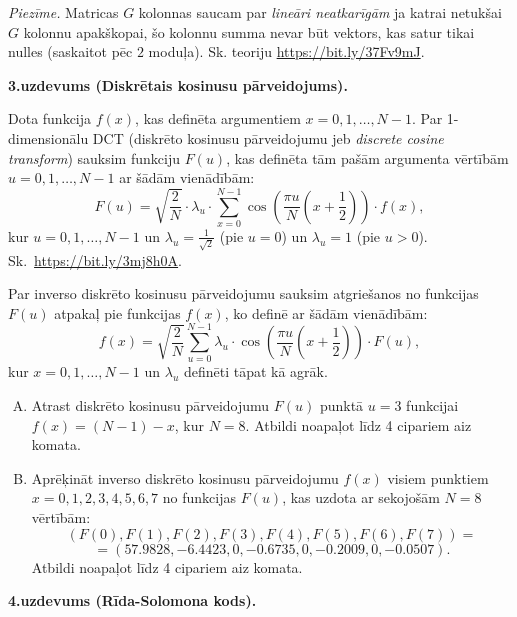 \documentclass[a4paper]{article}
\begin{document}
{\em Piezīme.} Matricas $G$ kolonnas saucam par {\em lineāri neatkarīgām} 
ja katrai netukšai $G$ kolonnu apakš\-ko\-pai, šo kolonnu summa nevar būt vektors, 
kas satur tikai nulles (saskaitot pēc $2$ moduļa).
Sk. teoriju \url{https://bit.ly/37Fv9mJ}.


\vspace{20pt}
{\bf 3.uzdevums (Diskrētais kosinusu pārveidojums).}

Dota funkcija $f(x)$, kas definēta argumentiem $x=0,1,\ldots,N-1$.
Par 1-dimensionālu DCT (diskrēto kosinusu pārveidojumu jeb {\em discrete cosine transform}) sauksim
funkciju $F(u)$, kas definēta tām pašām argumenta vērtībām $u=0,1,\ldots,N-1$
ar šādām vienādībām:
$$F(u) = \sqrt{\frac{2}{N}} \cdot \lambda_u \cdot \sum\limits_{x=0}^{N-1} \cos \left( \frac{\pi u}{N}\left(  x+\frac{1}{2} \right) \right) \cdot f(x),$$
kur $u=0,1,\ldots,N-1$ un $\lambda_u = \frac{1}{\sqrt{2}}$ (pie $u=0$) un $\lambda_u = 1$ (pie $u>0$).\\
Sk.\ \url{https://bit.ly/3mj8h0A}.

Par inverso diskrēto kosinusu pārveidojumu sauksim atgriešanos no funkcijas $F(u)$ atpakaļ pie funk\-ci\-jas $f(x)$,
ko definē ar šādām vienādībām:
$$f(x) = \sqrt{\frac{2}{N}} \sum\limits_{u=0}^{N-1} \lambda_u \cdot \cos \left( \frac{\pi u}{N}\left(  x+\frac{1}{2} \right) \right) \cdot F(u),$$
kur $x=0,1,\ldots,N-1$ un $\lambda_u$ definēti tāpat kā agrāk.
\begin{enumerate}[(A)]
\item
Atrast diskrēto kosinusu pārveidojumu $F(u)$ punktā $u=3$
funkcijai\\ $f(x) = (N-1)-x$, kur $N=8$.
Atbildi noapaļot līdz 4 cipariem aiz komata.
\item
Aprēķināt inverso diskrēto kosinusu pārveidojumu $f(x)$ visiem
punktiem\\ $x=0,1,2,3,4,5,6,7$ no funkcijas $F(u)$, kas uzdota ar
sekojošām $N=8$ vērtībām:
{\footnotesize
$$(F(0),F(1),F(2),F(3),F(4),F(5),F(6),F(7)) =$$
$$ = (57.9828,-6.4423,0,-0.6735,0,-0.2009,0,-0.0507).$$
}
Atbildi noapaļot līdz 4 cipariem aiz komata.
\end{enumerate}






\vspace{20pt}
{\bf 4.uzdevums (Rīda-Solomona kods).}
\end{document}
